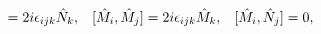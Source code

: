 \begin{equation}
[\hat{N}_{i},\hat{N}_{j}]=2i\epsilon_{ijk}\hat{N}_{k}, 
\hspace{0.3cm}
[\hat{M}_{i},\hat{M}_{j}]=2i\epsilon_{ijk}\hat{M}_{k},
\hspace{0.3cm} 
[\hat{M}_{i},\hat{N}_{j}]=0,  
\label{twosphereonfoursphere}
\end{equation}

